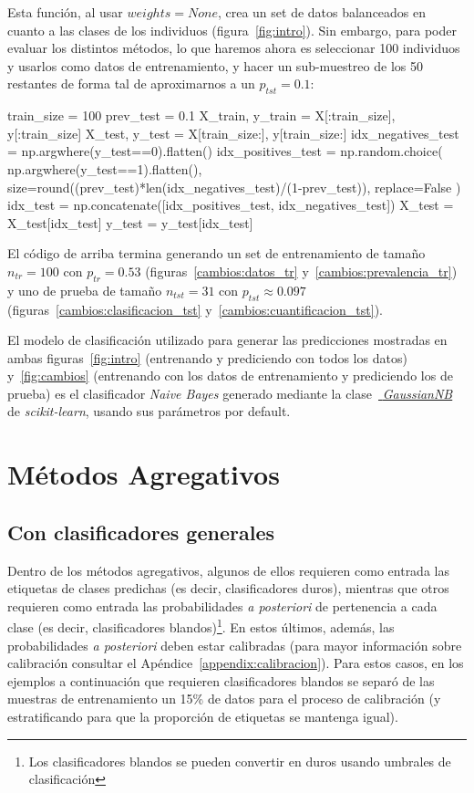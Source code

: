 Esta función, al usar \(weights=None\), crea un set de datos balanceados en
cuanto a las clases de los individuos (figura~\ref{fig:intro}). Sin embargo,
para poder evaluar los distintos métodos, lo que haremos ahora es seleccionar
100 individuos y usarlos como datos de entrenamiento, y hacer un sub-muestreo de
los 50 restantes de forma tal de aproximarnos a un \(p_{tst}=0.1\):

\begin{python}
train_size = 100
prev_test = 0.1
X_train, y_train = X[:train_size], y[:train_size]
X_test, y_test = X[train_size:], y[train_size:]
idx_negatives_test = np.argwhere(y_test==0).flatten()
idx_positives_test = np.random.choice(
    np.argwhere(y_test==1).flatten(),
    size=round((prev_test)*len(idx_negatives_test)/(1-prev_test)),
    replace=False
)
idx_test = np.concatenate([idx_positives_test, idx_negatives_test])
X_test = X_test[idx_test]
y_test = y_test[idx_test]
\end{python}

El código de arriba termina generando un set de entrenamiento de tamaño
\(n_{tr}=100\) con \(p_{tr}=0.53\) (figuras~\ref{cambios:datos_tr}
y~\ref{cambios:prevalencia_tr}) y uno de prueba de tamaño \(n_{tst}=31\) con
\(p_{tst}\approx0.097\) (figuras~\ref{cambios:clasificacion_tst}
y~\ref{cambios:cuantificacion_tst}).

El modelo de clasificación utilizado para generar las predicciones mostradas en
ambas figuras~\ref{fig:intro} (entrenando y prediciendo con todos los datos)
y~\ref{fig:cambios} (entrenando con los datos de entrenamiento y prediciendo los
de prueba) es el clasificador {\it Naive Bayes\/} generado mediante la
clase~\href{https://scikit-learn.org/stable/modules/generated/sklearn.naive_bayes.GaussianNB.html}{{\it
GaussianNB}} de {\it scikit-learn}, usando sus parámetros por default.

\section{Métodos Agregativos}\label{estimacion:agregativos}

\subsection{Con clasificadores generales}\label{estimacion:generales}

Dentro de los métodos agregativos, algunos de ellos requieren como entrada las
etiquetas de clases predichas (es decir, clasificadores duros), mientras que
otros requieren como entrada las probabilidades {\it a posteriori\/} de
pertenencia a cada clase (es decir, clasificadores blandos)\footnote{Los
clasificadores blandos se pueden convertir en duros usando umbrales de
clasificación}. En estos últimos, además, las probabilidades {\it a
posteriori\/} deben estar calibradas (para mayor información sobre calibración
consultar el Apéndice~\ref{appendix:calibracion}). Para estos casos, en los
ejemplos a continuación que requieren clasificadores blandos se separó de las
muestras de entrenamiento un 15\% de datos para el proceso de calibración
(y estratificando para que la proporción de etiquetas se mantenga igual).


